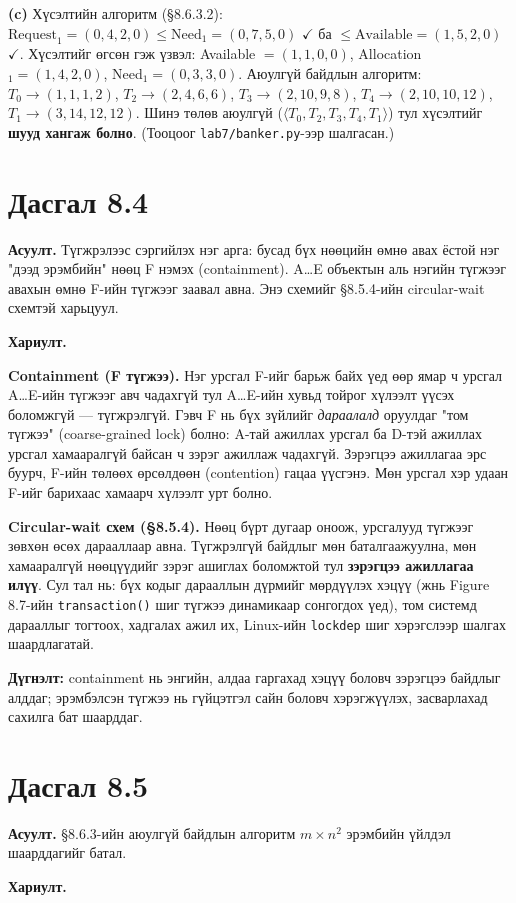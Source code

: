 \documentclass[12pt,a4paper]{article}
\newcommand{\question}[2]{\section{Дасгал #1}\textbf{Асуулт.} #2\par\medskip\textbf{Хариулт.}\par}
\begin{document}
\textbf{(c)} Хүсэлтийн алгоритм (§8.6.3.2): $\text{Request}_1 = (0,4,2,0) \le \text{Need}_1 = (0,7,5,0)$ $\checkmark$ ба $\le \text{Available} = (1,5,2,0)$ $\checkmark$. Хүсэлтийг өгсөн гэж үзвэл: Available $= (1,1,0,0)$, Allocation$_1 = (1,4,2,0)$, Need$_1 = (0,3,3,0)$. Аюулгүй байдлын алгоритм:
$T_0 \to (1,1,1,2)$, $T_2 \to (2,4,6,6)$, $T_3 \to (2,10,9,8)$, $T_4 \to (2,10,10,12)$, $T_1 \to (3,14,12,12)$.
Шинэ төлөв аюулгүй ($\langle T_0, T_2, T_3, T_4, T_1\rangle$) тул хүсэлтийг \textbf{шууд хангаж болно}. (Тооцоог \texttt{lab7/banker.py}-ээр шалгасан.)

\question{8.4}{Түгжрэлээс сэргийлэх нэг арга: бусад бүх нөөцийн өмнө авах ёстой нэг "дээд эрэмбийн" нөөц F нэмэх (containment). A…E объектын аль нэгийн түгжээг авахын өмнө F-ийн түгжээг заавал авна. Энэ схемийг §8.5.4-ийн circular-wait схемтэй харьцуул.}

\textbf{Containment (F түгжээ).} Нэг урсгал F-ийг барьж байх үед өөр ямар ч урсгал A…E-ийн түгжээг авч чадахгүй тул A…E-ийн хувьд тойрог хүлээлт үүсэх боломжгүй — түгжрэлгүй. Гэвч F нь бүх зүйлийг \emph{дараалалд} оруулдаг "том түгжээ" (coarse-grained lock) болно: A-тай ажиллах урсгал ба D-тэй ажиллах урсгал хамааралгүй байсан ч зэрэг ажиллаж чадахгүй. Зэрэгцээ ажиллагаа эрс буурч, F-ийн төлөөх өрсөлдөөн (contention) гацаа үүсгэнэ. Мөн урсгал хэр удаан F-ийг барихаас хамаарч хүлээлт урт болно.

\textbf{Circular-wait схем (§8.5.4).} Нөөц бүрт дугаар оноож, урсгалууд түгжээг зөвхөн өсөх дарааллаар авна. Түгжрэлгүй байдлыг мөн баталгаажуулна, мөн хамааралгүй нөөцүүдийг зэрэг ашиглах боломжтой тул \textbf{зэрэгцээ ажиллагаа илүү}. Сул тал нь: бүх кодыг дарааллын дүрмийг мөрдүүлэх хэцүү (жнь Figure 8.7-ийн \texttt{transaction()} шиг түгжээ динамикаар сонгогдох үед), том системд дарааллыг тогтоох, хадгалах ажил их, Linux-ийн \texttt{lockdep} шиг хэрэгслээр шалгах шаардлагатай.

\textbf{Дүгнэлт:} containment нь энгийн, алдаа гаргахад хэцүү боловч зэрэгцээ байдлыг алддаг; эрэмбэлсэн түгжээ нь гүйцэтгэл сайн боловч хэрэгжүүлэх, засварлахад сахилга бат шаарддаг.

\question{8.5}{§8.6.3-ийн аюулгүй байдлын алгоритм $m \times n^2$ эрэмбийн үйлдэл шаарддагийг батал.}
\end{document}
